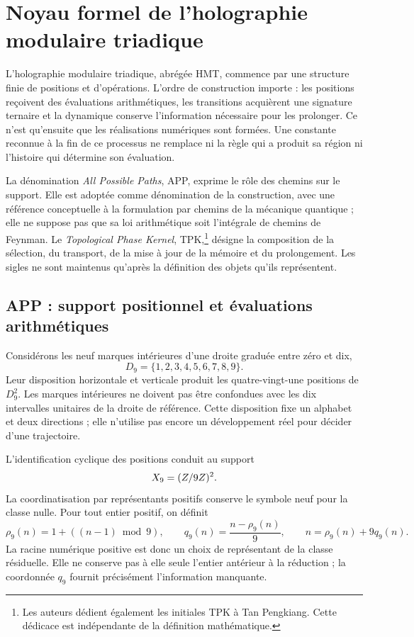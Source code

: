 \section{Noyau formel de l'holographie modulaire triadique}
\label{sec:nucleo}

L'holographie modulaire triadique, abrégée HMT, commence par une structure finie de positions et d'opérations. L'ordre de construction importe : les positions reçoivent des évaluations arithmétiques, les transitions acquièrent une signature ternaire et la dynamique conserve l'information nécessaire pour les prolonger. Ce n'est qu'ensuite que les réalisations numériques sont formées. Une constante reconnue à la fin de ce processus ne remplace ni la règle qui a produit sa région ni l'histoire qui détermine son évaluation.

La dénomination \emph{All Possible Paths}, APP, exprime le rôle des chemins sur le support. Elle est adoptée comme dénomination de la construction, avec une référence conceptuelle à la formulation par chemins de la mécanique quantique ; elle ne suppose pas que sa loi arithmétique soit l'intégrale de chemins de Feynman. Le \emph{Topological Phase Kernel}, TPK,\footnote{Les auteurs dédient également les initiales TPK à Tan Pengkiang. Cette dédicace est indépendante de la définition mathématique.} désigne la composition de la sélection, du transport, de la mise à jour de la mémoire et du prolongement. Les sigles ne sont maintenus qu'après la définition des objets qu'ils représentent.

\subsection{APP : support positionnel et évaluations arithmétiques}

Considérons les neuf marques intérieures d'une droite graduée entre zéro et dix,
\[
 D_9=\{1,2,3,4,5,6,7,8,9\}.
\]
Leur disposition horizontale et verticale produit les quatre-vingt-une positions de \(D_9^2\). Les marques intérieures ne doivent pas être confondues avec les dix intervalles unitaires de la droite de référence. Cette disposition fixe un alphabet et deux directions ; elle n'utilise pas encore un développement réel pour décider d'une trajectoire.

L'identification cyclique des positions conduit au support
\[
 X_9=(Z/9Z)^2.
\]
La coordinatisation par représentants positifs conserve le symbole neuf pour la classe nulle. Pour tout entier positif, on définit
\begin{equation}
 \rho_9(n)=1+((n-1)\bmod9),\qquad
 q_9(n)=\frac{n-\rho_9(n)}9,
 \qquad n=\rho_9(n)+9q_9(n).
 \label{eq:residuo-cociente}
\end{equation}
La racine numérique positive est donc un choix de représentant de la classe résiduelle. Elle ne conserve pas à elle seule l'entier antérieur à la réduction ; la coordonnée \(q_9\) fournit précisément l'information manquante.

